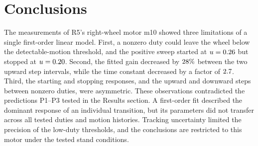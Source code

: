 \section{Conclusions}
\label{sec:conclusions}

The measurements of R5's right-wheel motor m10 showed three limitations
of a single first-order linear model. First, a nonzero duty could leave
the wheel below the detectable-motion threshold, and the positive sweep
started at $u=0.26$ but stopped at $u=0.20$. Second, the
fitted gain decreased by $28\%$ between the two upward step
intervals, while the time constant decreased by a factor of $2.7$.
Third, the starting and stopping responses, and the upward and downward
steps between nonzero duties, were asymmetric. These observations
contradicted the predictions P1--P3 tested in the Results section.
A first-order fit described the dominant response of an individual
transition, but its parameters did not transfer across all tested duties
and motion histories. Tracking uncertainty limited the precision of the
low-duty thresholds, and the conclusions are restricted to this motor
under the tested stand conditions.
